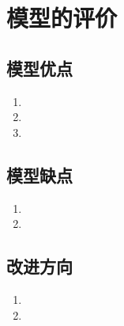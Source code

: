 \documentclass[withoutpreface,bwprint]{cumcmthesis} %
\begin{document}
\section{模型的评价}
\subsection{模型优点}
\begin{enumerate}
    \item 
    \item 
    \item 
\end{enumerate}

\subsection{模型缺点}
\begin{enumerate}
    \item 
    \item 
\end{enumerate}

\subsection{改进方向}
\begin{enumerate}
    \item 
    \item 
\end{enumerate}



\end{document}
